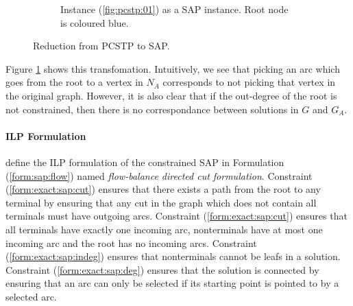 \begin{figure}[h]
\begin{subfigure}[t]{0.47\linewidth}
    \caption{Instance (\ref{fig:pcstp:01}) as a SAP instance. Root node is coloured blue.}
  \end{subfigure}
  \caption{Reduction from PCSTP to SAP.}
  \label{fig:scip:pcstptosap}
\end{figure}

Figure \ref{fig:scip:pcstptosap} shows this transfomation. Intuitively, we see that
picking an arc which goes from the root to a vertex in $N_A$ corresponds to not picking
that vertex in the original graph. However, it is also clear that if the out-degree of
the root is not constrained, then there is no correspondance between solutions in $G$
 and $G_A$.

 \paragraph{ILP Formulation}
 \cite{gamrath2017scip} define the ILP formulation of the constrained SAP in Formulation (\ref{form:sap:flow})
 named \textit{flow-balance directed cut formulation}. Constraint (\ref{form:exact:sap:cut}) ensures that there exists a
  path from the root to any terminal by ensuring that any
 cut in the graph which does not contain all terminals must have outgoing arcs. Constraint (\ref{form:exact:sap:cut})
 ensures that all terminals have exactly one incoming arc, nonterminals have at most one incoming arc and the root has
 no incoming arcs. Constraint (\ref{form:exact:sap:indeg}) ensures that nonterminals cannot be leafs in a solution.
 Constraint (\ref{form:exact:sap:deg}) ensures that the solution is connected by ensuring that an arc can only be selected
 if its starting point is pointed to by a selected arc.

